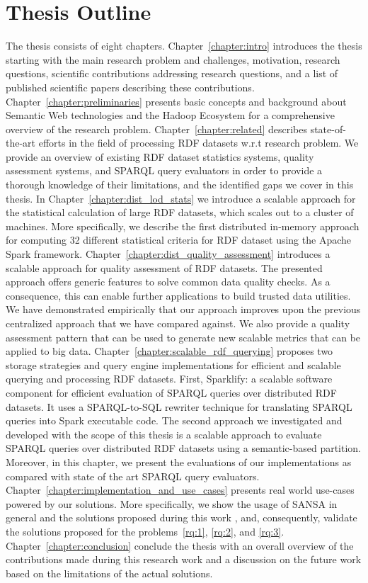 \section{Thesis Outline}
\label{sec:thesis-outline}
The thesis consists of eight chapters.
Chapter~\ref{chapter:intro} introduces the thesis starting with the main research problem and challenges, motivation, research questions, scientific contributions addressing research questions, and a list of published scientific papers describing these contributions.
Chapter~\ref{chapter:preliminaries} presents basic concepts and background about Semantic Web technologies and the Hadoop Ecosystem for a comprehensive overview of the research problem. 
Chapter~\ref{chapter:related} describes state-of-the-art efforts in the field of processing \gls{RDF} datasets w.r.t research problem.
We provide an overview of existing \gls{RDF} dataset statistics systems, quality assessment systems, and \gls{SPARQL} query evaluators in order to provide a thorough knowledge of their limitations, and the identified gaps we cover in this thesis.
In Chapter~\ref{chapter:dist_lod_stats} we introduce a scalable approach for the statistical calculation of large \gls{RDF} datasets, which scales out to a cluster of machines.
More specifically, we describe the first distributed in-memory approach for computing 32 different statistical criteria for \gls{RDF} dataset using the Apache Spark framework.
Chapter~\ref{chapter:dist_quality_assessment} introduces a scalable approach for quality assessment of \gls{RDF} datasets.
The presented approach offers generic features to solve common data quality checks.
As a consequence, this can enable further applications to build trusted data utilities.
We have demonstrated empirically that our approach improves upon the previous centralized approach that we have compared against.
We also provide a quality assessment pattern that can be used to generate new scalable metrics that can be applied to big data.
Chapter~\ref{chapter:scalable_rdf_querying} proposes two storage strategies and query engine implementations for efficient and scalable querying and processing \gls{RDF} datasets.
First, Sparklify: a scalable software component for efficient evaluation of \gls{SPARQL} queries over distributed \gls{RDF} datasets. 
It uses a SPARQL-to-SQL rewriter technique for translating \gls{SPARQL} queries into Spark executable code.
The second approach we investigated and developed with the scope of this thesis is a scalable approach to evaluate \gls{SPARQL} queries over distributed \gls{RDF} datasets using a semantic-based partition.
Moreover, in this chapter, we present the evaluations of our implementations as compared with state of the art \gls{SPARQL} query evaluators.
Chapter~\ref{chapter:implementation_and_use_cases} presents real world use-cases powered by our solutions. 
More specifically, we show the usage of SANSA in general and the solutions proposed during this work
, and, consequently, validate the solutions proposed for the problems~\ref{rq:1}, \ref{rq:2}, and \ref{rq:3}.
Chapter~\ref{chapter:conclusion} conclude the thesis with an overall overview of the contributions made during this research work and a discussion on the future work based on the limitations of the actual solutions. 
